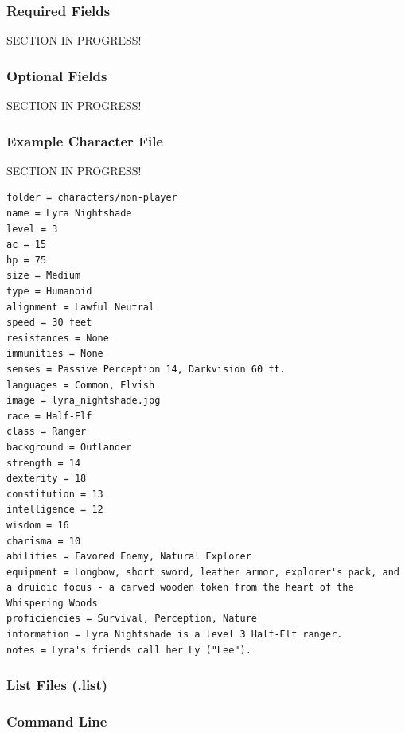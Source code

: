 \subsubsection{Required Fields}

SECTION IN PROGRESS!

\subsubsection{Optional Fields}

SECTION IN PROGRESS!



\subsubsection{Example Character File}

SECTION IN PROGRESS!

\begin{lstlisting}
folder = characters/non-player
name = Lyra Nightshade
level = 3
ac = 15
hp = 75
size = Medium
type = Humanoid
alignment = Lawful Neutral
speed = 30 feet
resistances = None
immunities = None
senses = Passive Perception 14, Darkvision 60 ft.
languages = Common, Elvish
image = lyra_nightshade.jpg
race = Half-Elf
class = Ranger
background = Outlander
strength = 14
dexterity = 18
constitution = 13
intelligence = 12
wisdom = 16
charisma = 10
abilities = Favored Enemy, Natural Explorer
equipment = Longbow, short sword, leather armor, explorer's pack, and a druidic focus - a carved wooden token from the heart of the Whispering Woods
proficiencies = Survival, Perception, Nature
information = Lyra Nightshade is a level 3 Half-Elf ranger.
notes = Lyra's friends call her Ly ("Lee").
\end{lstlisting}






\subsubsection{List Files (.list)}















\subsubsection{Command Line}

